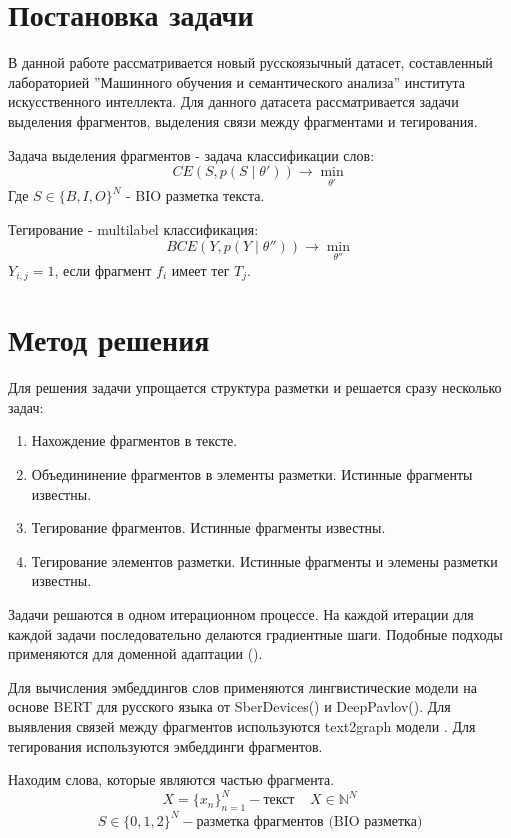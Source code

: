 \documentclass{article}
\begin{document}
\section{Постановка задачи}

В данной работе рассматривается новый русскоязычный датасет, составленный лабораторией ''Машинного обучения и семантического анализа'' института искусственного интеллекта. Для данного датасета рассматривается задачи выделения фрагментов, выделения связи между фрагментами и тегирования.

Задача выделения фрагментов - задача классификации слов:
$$
CE(S, p(S \mid \theta')) \rightarrow \min_{\theta'}
$$
Где $S \in \{B, I, O \}^{N}$ - BIO разметка текста.

Тегирование - multilabel классификация:
$$
BCE(Y, p(Y \mid \theta'')) \rightarrow \min_{\theta''}
$$
$Y_{i, j} = 1$, если фрагмент $f_i$ имеет тег $T_j$.

\section{Метод решения}

Для решения задачи упрощается структура разметки и решается сразу несколько задач:
\begin{enumerate}
  \item Нахождение фрагментов в тексте.
  \item Объедининение фрагментов в элементы разметки. Истинные фрагменты известны.
  \item Тегирование фрагментов. Истинные фрагменты известны.
  \item Тегирование элементов разметки. Истинные фрагменты и элемены разметки известны.
\end{enumerate}
Задачи решаются в одном итерационном процессе. На каждой итерации для каждой задачи последовательно делаются градиентные шаги. Подобные подходы применяются для доменной адаптации (\cite{baly2020we}).

Для вычисления эмбеддингов слов применяются лингвистические модели на основе BERT для русского языка от SberDevices(\cite{zmitrovich2023family}) и DeepPavlov(\cite{kuratov2019adaptation}). Для выявления связей между фрагментов используются text2graph модели \cite{guo2020cyclegt}. Для тегирования используются эмбеддинги фрагментов.

Находим слова, которые являются частью фрагмента.
$$
X = \{ x_n \}_{n=1}^{N} - \text{текст}~~~~~X \in \mathbb{N}^{N}
$$
$$
S \in \{0, 1, 2\}^{N} - \text{разметка фрагментов (BIO разметка)}
$$
\end{document}
